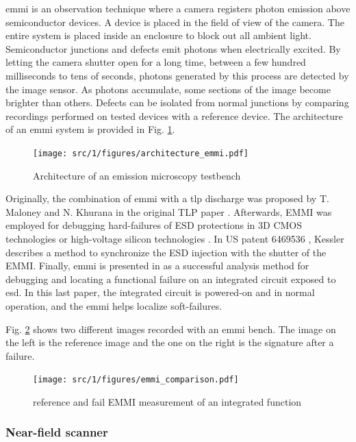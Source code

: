 \gls{emmi} is an observation technique where a camera registers photon emission above semiconductor devices.
A device is placed in the field of view of the camera.
The entire system is placed inside an enclosure to block out all ambient light.
Semiconductor junctions and defects emit photons when electrically excited.
By letting the camera shutter open for a long time, between a few hundred milliseconds to tens of seconds, photons generated by this process are detected by the image sensor.
As photons accumulate, some sections of the image become brighter than others.
Defects can be isolated from normal junctions by comparing recordings performed on tested devices with a reference device.
The architecture of an \gls{emmi} system is provided in Fig. \ref{fig:emmi}.

\begin{figure}[!h]
  \centering
  \texttt{[image: src/1/figures/architecture\_emmi.pdf]}
  \caption{Architecture of an emission microscopy testbench}
  \label{fig:emmi}
\end{figure}

Originally, the combination of \gls{emmi} with a \gls{tlp} discharge was proposed by T. Maloney and N. Khurana in the original TLP paper \cite{TLP}.
Afterwards, EMMI was employed for debugging hard-failures of ESD protections in 3D CMOS technologies \cite{kessler2002method} or high-voltage silicon technologies \cite{emmi-tlp}.
In US patent 6469536 \cite{kessler2002method}, Kessler describes a method to synchronize the ESD injection with the shutter of the EMMI.
Finally, \gls{emmi} is presented in \cite{softfailEMMI} as a successful analysis method for debugging and locating a functional failure on an integrated circuit exposed to \gls{esd}.
In this last paper, the integrated circuit is powered-on and in normal operation, and the \gls{emmi} helps localize soft-failures.

Fig. \ref{fig:emmi-examples} shows two different images recorded with an \gls{emmi} bench.
The image on the left is the reference image and the one on the right is the signature after a failure.

\begin{figure}[!h]
  \centering
  \texttt{[image: src/1/figures/emmi\_comparison.pdf]}
  \caption{reference and fail EMMI measurement of an integrated function}
  \label{fig:emmi-examples}
\end{figure}

\subsubsection{Near-field scanner}
\label{sec:near-field-scan}

